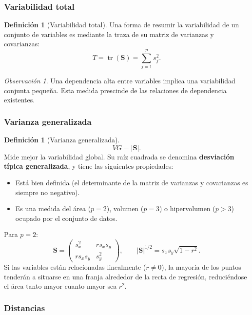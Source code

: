 \documentclass[12pt, a4paper]{article}
\theoremstyle{plain}
\theoremstyle{definition}
\newtheorem{definicion}[teorema]{Definición}
\theoremstyle{remark}
\newtheorem*{observacion}{Observación}
\newcommand{\mat}[1]{\mathbf{#1}}
\newcommand{\tr}{\operatorname{tr}}
\begin{document}
\subsubsection{Variabilidad total}

\begin{definicion}[Variabilidad total]
Una forma de resumir la variabilidad de un conjunto de variables es mediante la
traza de su matriz de varianzas y covarianzas:
\[
  T = \tr(\mat{S}) = \sum_{j=1}^p s_j^2.
\]
\end{definicion}

\begin{observacion}
Una dependencia alta entre variables implica una variabilidad conjunta pequeña.
Esta medida prescinde de las relaciones de dependencia existentes.
\end{observacion}

\subsubsection{Varianza generalizada}

\begin{definicion}[Varianza generalizada]
\[
  VG = |\mat{S}|.
\]
Mide mejor la variabilidad global. Su raíz cuadrada se denomina
\textbf{desviación típica generalizada}, y tiene las siguientes propiedades:
\begin{itemize}
  \item Está bien definida (el determinante de la matriz de varianzas y
        covarianzas es siempre no negativo).
  \item Es una medida del área ($p=2$), volumen ($p=3$) o hipervolumen
        ($p>3$) ocupado por el conjunto de datos.
\end{itemize}
\end{definicion}

Para $p=2$:
\[
  \mat{S} = \begin{pmatrix}s_x^2 & rs_xs_y \\ rs_xs_y & s_y^2\end{pmatrix},
  \qquad |\mat{S}|^{1/2} = s_xs_y\sqrt{1-r^2}.
\]
Si las variables están relacionadas linealmente ($r\neq0$), la mayoría de los
puntos tenderán a situarse en una franja alrededor de la recta de regresión,
reduciéndose el área tanto mayor cuanto mayor sea $r^2$.

\subsubsection{Distancias}
\end{document}
